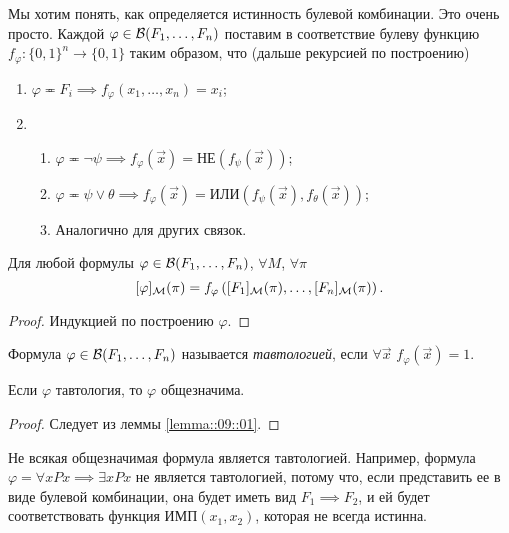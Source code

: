 Мы хотим понять, как определяется истинность булевой комбинации.
Это очень просто.
Каждой $\varphi \in \mathcal{B}(F_{1}, \ldots, F_{n})$ поставим в соответствие булеву функцию $f_{\varphi} \colon \{0, 1\}^{n} \to \{0, 1\}$ таким образом, что (дальше рекурсией по построению)
\begin{enumerate}
    \item $\varphi \eqcirc F_{i} \implies f_{\varphi}(x_{1}, \ldots, x_{n}) = x_{i}$;
    \item \begin{enumerate}
        \item $\varphi \eqcirc \neg \psi \implies f_{\varphi}(\vec{x}) = \text{НЕ}(f_{\psi}(\vec{x}))$;
        \item $\varphi \eqcirc \psi \lor \theta \implies f_{\varphi}(\vec{x}) = \text{ИЛИ}(f_{\psi}(\vec{x}), f_{\theta}(\vec{x}))$;
        \item Аналогично для других связок.
    \end{enumerate}
\end{enumerate}

\begin{lemma} \label{lemma::09::01}
    Для любой формулы $\varphi \in \mathcal{B}(F_{1}, \ldots, F_{n})$, $\forall M$, $\forall \pi$
    $$
        [\varphi]_{\mathcal{M}}(\pi) = f_{\varphi}\left([F_{1}]_{\mathcal{M}}(\pi), \ldots, [F_{n}]_{\mathcal{M}}(\pi)\right).
    $$
\end{lemma}

\begin{proof}
    Индукцией по построению $\varphi$.
\end{proof}

\begin{definition}
    Формула $\varphi \in \mathcal{B}(F_{1}, \ldots, F_{n})$ называется {\it тавтологией}, если $\forall \vec{x}$ $f_{\varphi}(\vec{x}) = 1$.
\end{definition}

\begin{statement}
    Если $\varphi$ тавтология, то $\varphi$ общезначима.
\end{statement}

\begin{proof}
    Следует из леммы \ref{lemma::09::01}.
\end{proof}

Не всякая общезначимая формула является тавтологией.
Например, формула $\varphi = \forall x Px \implies \exists x Px$ не является тавтологией, потому что, если представить ее в виде булевой комбинации, она будет иметь вид $F_{1} \implies F_{2}$, и ей будет соответствовать функция $\text{ИМП}(x_{1}, x_{2})$, которая не всегда истинна.

